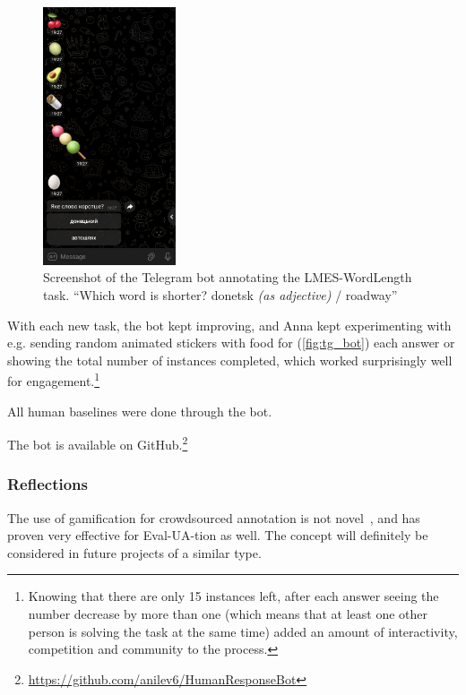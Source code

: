 \begin{figure}
    \includegraphics[width=0.35\textwidth]{Figures/tg_bot_screenshot.jpg}
    \caption[Screenshot of the Telegram bot used for human baselines]{Screenshot of the Telegram bot annotating the LMES-WordLength task. \enquote{Which word is shorter? donetsk \textit{(as adjective)} / roadway}}
    \label{fig:tg_bot}
\end{figure}

With each new task, the bot kept improving, and Anna kept experimenting with e.g. sending random animated stickers with food for (\autoref{fig:tg_bot}) each answer or showing the total number of instances completed, which worked surprisingly well for engagement.\footnote{Knowing that there are only 15 instances left, after each answer seeing the number decrease by more than one (which means that at least one other person is solving the task at the same time) added an amount of interactivity, competition 
 and community to the process.}

All human baselines were done through the bot. 

The bot is available on GitHub.\footnote{\href{https://github.com/anilev6/HumanResponseBot}{https://github.com/anilev6/HumanResponseBot}}

\subsubsection{Reflections}
The use of gamification for crowdsourced annotation is not novel~\cite{inproceedings}, and has proven very effective for Eval-UA-tion as well. 
The concept will definitely be considered in future projects of a similar type.

